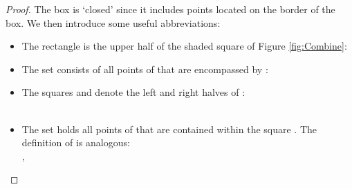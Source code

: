 \begin{isabellebody}
\begin{isamarkuptext}
\begin{proof}
The box is `closed' since it includes points located on the border of the box. We then introduce
some useful abbreviations:

\begin{itemize}
\setlength{\itemsep}{1pt}
\setlength{\parskip}{0pt}
\setlength{\parsep}{0pt}
\item The rectangle  is the upper half of the shaded square of Figure \ref{fig:Combine}: \\
\item The set  consists of all points of  that are encompassed by : \\
\item The squares  and  denote the left and right halves of : \\
       \\
\item The set  holds all points of  that are contained within the square . The definition
      of  is analogous: \\
      , 
\end{itemize}


\end{proof}
\end{isamarkuptext}
\end{isabellebody}
